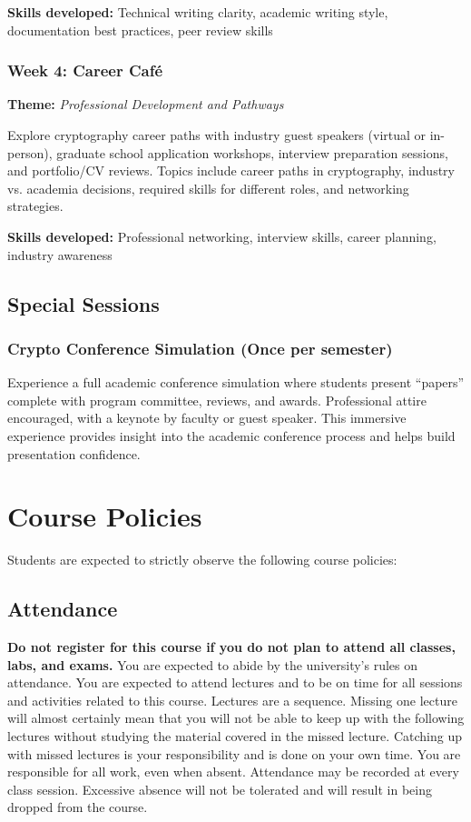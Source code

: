 \documentclass[10pt,a4paper,american]{article}
\begin{document}
\textbf{Skills developed:} Technical writing clarity, academic writing style, documentation best practices, peer review skills

\subsubsection*{Week 4: Career Café}
\textbf{Theme:} \textit{Professional Development and Pathways}

Explore cryptography career paths with industry guest speakers (virtual or in-person), graduate school application workshops, interview preparation sessions, and portfolio/CV reviews. Topics include career paths in cryptography, industry vs. academia decisions, required skills for different roles, and networking strategies.

\textbf{Skills developed:} Professional networking, interview skills, career planning, industry awareness

\subsection{Special Sessions}

\subsubsection*{Crypto Conference Simulation (Once per semester)}
Experience a full academic conference simulation where students present ``papers'' complete with program committee, reviews, and awards. Professional attire encouraged, with a keynote by faculty or guest speaker. This immersive experience provides insight into the academic conference process and helps build presentation confidence.

\section{Course Policies}
Students are expected to strictly observe the following course policies:

\subsection{Attendance}
\textbf{Do not register for this course if you do not plan to attend all classes, labs, and exams.} You are expected to abide by the university's rules on attendance. You are expected to attend lectures and to be on time for all sessions and activities related to this course. Lectures are a sequence. Missing one lecture will almost certainly mean that you will not be able to keep up with the following lectures without studying the material covered in the missed lecture. Catching up with missed lectures is your responsibility and is done on your own time. You are responsible for all work, even when absent. Attendance may be recorded at every class session. Excessive absence will not be tolerated and will result in being dropped from the course.
\end{document}

